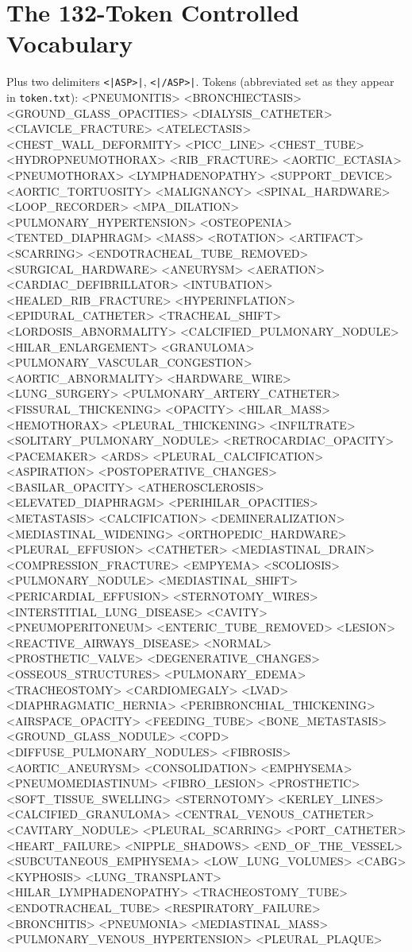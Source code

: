 \documentclass[11pt,a4paper]{article}
\begin{document}
\section{The 132-Token Controlled Vocabulary}
\label{app:vocab}
Plus two delimiters \texttt{<|ASP>|}, \texttt{<|/ASP>|}. Tokens (abbreviated set as they appear in \texttt{token.txt}):
{\footnotesize\ttfamily
<PNEUMONITIS> <BRONCHIECTASIS> <GROUND\_GLASS\_OPACITIES> <DIALYSIS\_CATHETER> <CLAVICLE\_FRACTURE> <ATELECTASIS> <CHEST\_WALL\_DEFORMITY> <PICC\_LINE> <CHEST\_TUBE> <HYDROPNEUMOTHORAX> <RIB\_FRACTURE> <AORTIC\_ECTASIA> <PNEUMOTHORAX> <LYMPHADENOPATHY> <SUPPORT\_DEVICE> <AORTIC\_TORTUOSITY> <MALIGNANCY> <SPINAL\_HARDWARE> <LOOP\_RECORDER> <MPA\_DILATION> <PULMONARY\_HYPERTENSION> <OSTEOPENIA> <TENTED\_DIAPHRAGM> <MASS> <ROTATION> <ARTIFACT> <SCARRING> <ENDOTRACHEAL\_TUBE\_REMOVED> <SURGICAL\_HARDWARE> <ANEURYSM> <AERATION> <CARDIAC\_DEFIBRILLATOR> <INTUBATION> <HEALED\_RIB\_FRACTURE> <HYPERINFLATION> <EPIDURAL\_CATHETER> <TRACHEAL\_SHIFT> <LORDOSIS\_ABNORMALITY> <CALCIFIED\_PULMONARY\_NODULE> <HILAR\_ENLARGEMENT> <GRANULOMA> <PULMONARY\_VASCULAR\_CONGESTION> <AORTIC\_ABNORMALITY> <HARDWARE\_WIRE> <LUNG\_SURGERY> <PULMONARY\_ARTERY\_CATHETER> <FISSURAL\_THICKENING> <OPACITY> <HILAR\_MASS> <HEMOTHORAX> <PLEURAL\_THICKENING> <INFILTRATE> <SOLITARY\_PULMONARY\_NODULE> <RETROCARDIAC\_OPACITY> <PACEMAKER> <ARDS> <PLEURAL\_CALCIFICATION> <ASPIRATION> <POSTOPERATIVE\_CHANGES> <BASILAR\_OPACITY> <ATHEROSCLEROSIS> <ELEVATED\_DIAPHRAGM> <PERIHILAR\_OPACITIES> <METASTASIS> <CALCIFICATION> <DEMINERALIZATION> <MEDIASTINAL\_WIDENING> <ORTHOPEDIC\_HARDWARE> <PLEURAL\_EFFUSION> <CATHETER> <MEDIASTINAL\_DRAIN> <COMPRESSION\_FRACTURE> <EMPYEMA> <SCOLIOSIS> <PULMONARY\_NODULE> <MEDIASTINAL\_SHIFT> <PERICARDIAL\_EFFUSION> <STERNOTOMY\_WIRES> <INTERSTITIAL\_LUNG\_DISEASE> <CAVITY> <PNEUMOPERITONEUM> <ENTERIC\_TUBE\_REMOVED> <LESION> <REACTIVE\_AIRWAYS\_DISEASE> <NORMAL> <PROSTHETIC\_VALVE> <DEGENERATIVE\_CHANGES> <OSSEOUS\_STRUCTURES> <PULMONARY\_EDEMA> <TRACHEOSTOMY> <CARDIOMEGALY> <LVAD> <DIAPHRAGMATIC\_HERNIA> <PERIBRONCHIAL\_THICKENING> <AIRSPACE\_OPACITY> <FEEDING\_TUBE> <BONE\_METASTASIS> <GROUND\_GLASS\_NODULE> <COPD> <DIFFUSE\_PULMONARY\_NODULES> <FIBROSIS> <AORTIC\_ANEURYSM> <CONSOLIDATION> <EMPHYSEMA> <PNEUMOMEDIASTINUM> <FIBRO\_LESION> <PROSTHETIC> <SOFT\_TISSUE\_SWELLING> <STERNOTOMY> <KERLEY\_LINES> <CALCIFIED\_GRANULOMA> <CENTRAL\_VENOUS\_CATHETER> <CAVITARY\_NODULE> <PLEURAL\_SCARRING> <PORT\_CATHETER> <HEART\_FAILURE> <NIPPLE\_SHADOWS> <END\_OF\_THE\_VESSEL> <SUBCUTANEOUS\_EMPHYSEMA> <LOW\_LUNG\_VOLUMES> <CABG> <KYPHOSIS> <LUNG\_TRANSPLANT> <HILAR\_LYMPHADENOPATHY> <TRACHEOSTOMY\_TUBE> <ENDOTRACHEAL\_TUBE> <RESPIRATORY\_FAILURE> <BRONCHITIS> <PNEUMONIA> <MEDIASTINAL\_MASS> <PULMONARY\_VENOUS\_HYPERTENSION> <PLEURAL\_PLAQUE>
}
\end{document}
